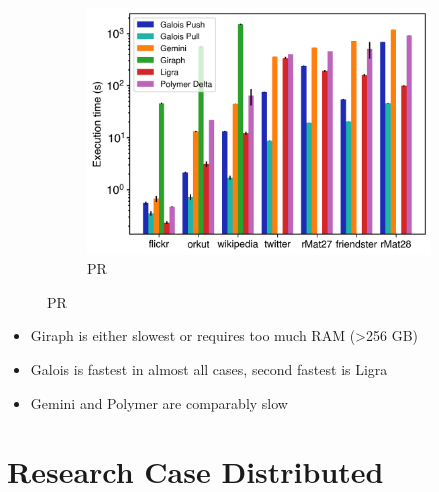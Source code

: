 \documentclass{meetings}
\begin{document}
\begin{figure}[h]
\begin{subfigure}{0.32\textwidth}
		\includegraphics[width=\linewidth]{../../plots/singleNodePR_execTime.png}
		\caption{PR}
		\label{fig:singleNodeSSSP_exec}
	\end{subfigure}
\end{figure}
\begin{itemize}
	\item Giraph is either slowest or requires too much RAM (>256 GB)
	\item Galois is fastest in almost all cases, second fastest is Ligra
	\item Gemini and Polymer are comparably slow
\end{itemize}

\clearpage
\section{Research Case Distributed}
\end{document}
